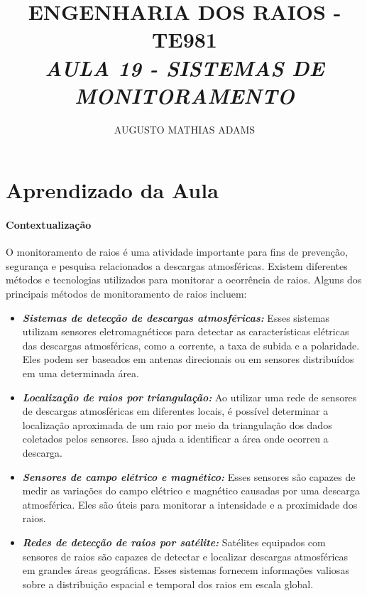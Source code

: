 \documentclass[a4paper, 12pt, onecolumn,singlespacing]{article}
\title{\normalsize{ENGENHARIA DOS RAIOS - TE981}\\ \huge{\textbf\textit{{AULA 19 - SISTEMAS DE MONITORAMENTO}}\\}}
\author{\small{AUGUSTO MATHIAS ADAMS}}
\begin{document}
	
	\maketitle
	
	\section{Aprendizado da Aula}
	\paragraph{Contextualização}
	O monitoramento de raios é uma atividade importante para fins de prevenção, segurança e pesquisa relacionados a descargas atmosféricas. Existem diferentes métodos e tecnologias utilizados para monitorar a ocorrência de raios. Alguns dos principais métodos de monitoramento de raios incluem:
	
	\begin{itemize}
		\item \textbf{\textit{Sistemas de detecção de descargas atmosféricas:}} Esses sistemas utilizam sensores eletromagnéticos para detectar as características elétricas das descargas atmosféricas, como a corrente, a taxa de subida e a polaridade. Eles podem ser baseados em antenas direcionais ou em sensores distribuídos em uma determinada área.
		
		\item \textbf{\textit{Localização de raios por triangulação:}} Ao utilizar uma rede de sensores de descargas atmosféricas em diferentes locais, é possível determinar a localização aproximada de um raio por meio da triangulação dos dados coletados pelos sensores. Isso ajuda a identificar a área onde ocorreu a descarga.
		
		\item \textbf{\textit{Sensores de campo elétrico e magnético:}} Esses sensores são capazes de medir as variações do campo elétrico e magnético causadas por uma descarga atmosférica. Eles são úteis para monitorar a intensidade e a proximidade dos raios.
		
		\item \textbf{\textit{Redes de detecção de raios por satélite:}} Satélites equipados com sensores de raios são capazes de detectar e localizar descargas atmosféricas em grandes áreas geográficas. Esses sistemas fornecem informações valiosas sobre a distribuição espacial e temporal dos raios em escala global.
	\end{itemize}
	
\end{document}
